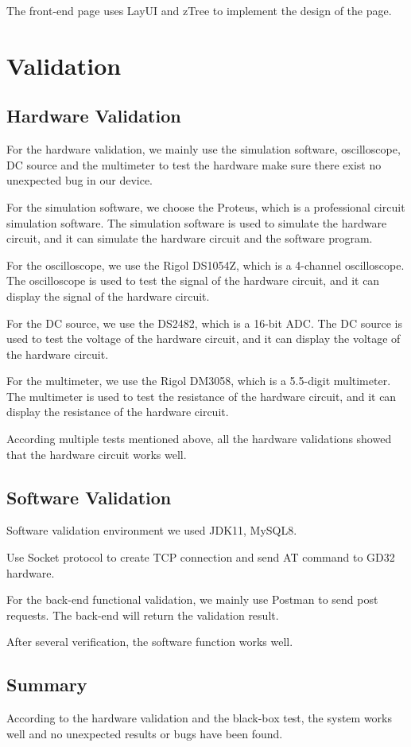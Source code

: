 \documentclass[11pt, a4paper]{article}
\begin{document}
The front-end page uses LayUI and zTree to implement the design of the page.

\section{Validation}
\subsection{Hardware Validation}

For the hardware validation, we mainly use the simulation software, oscilloscope, DC source and the multimeter to test the hardware make sure there exist no unexpected bug in our device.

For the simulation software, we choose the Proteus, which is a professional circuit simulation software.
The simulation software is used to simulate the hardware circuit, and it can simulate the hardware circuit and the software program.

For the oscilloscope, we use the Rigol DS1054Z, which is a 4-channel oscilloscope.
The oscilloscope is used to test the signal of the hardware circuit, and it can display the signal of the hardware circuit.

For the DC source, we use the DS2482, which is a 16-bit ADC.
The DC source is used to test the voltage of the hardware circuit, and it can display the voltage of the hardware circuit.

For the multimeter, we use the Rigol DM3058, which is a 5.5-digit multimeter.
The multimeter is used to test the resistance of the hardware circuit, and it can display the resistance of the hardware circuit.

According multiple tests mentioned above, all the hardware validations showed that the hardware circuit works well.
\subsection{Software Validation}
Software validation environment we used JDK11, MySQL8.

Use Socket protocol to create TCP connection and send AT command to GD32 hardware.

For the back-end functional validation, we mainly use Postman to send post requests. The back-end will return the validation result.

After several verification, the software function works well.

\subsection{Summary}
According to the hardware validation and the black-box test, the system works well and no unexpected results or bugs have been found.
\end{document}
